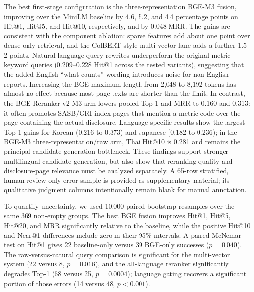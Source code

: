 \documentclass[sigconf,article]{acmart}
\begin{document}
The best first-stage configuration is the three-representation BGE-M3 fusion, improving over the MiniLM baseline by 4.6, 5.2, and 4.4 percentage points on Hit@1, Hit@5, and Hit@10, respectively, and by 0.048 MRR. The gains are consistent with the component ablation: sparse features add about one point over dense-only retrieval, and the ColBERT-style multi-vector lane adds a further 1.5--2 points. Natural-language query rewrites underperform the original metric-keyword queries (0.209--0.228 Hit@1 across the tested variants), suggesting that the added English ``what counts'' wording introduces noise for non-English reports. Increasing the BGE maximum length from 2,048 to 8,192 tokens has almost no effect because most page texts are shorter than the limit. In contrast, the BGE-Reranker-v2-M3 arm lowers pooled Top-1 and MRR to 0.160 and 0.313: it often promotes SASB/GRI index pages that mention a metric code over the page containing the actual disclosure. Language-specific results show the largest Top-1 gains for Korean (0.216 to 0.373) and Japanese (0.182 to 0.236); in the BGE-M3 three-representation/raw arm, Thai Hit@10 is 0.281 and remains the principal candidate-generation bottleneck. These findings support stronger multilingual candidate generation, but also show that reranking quality and disclosure-page relevance must be analyzed separately. A 65-row stratified, human-review-only error sample is provided as supplementary material; its qualitative judgment columns intentionally remain blank for manual annotation.

To quantify uncertainty, we used 10,000 paired bootstrap resamples over the same 369 non-empty groups. The best BGE fusion improves Hit@1, Hit@5, Hit@20, and MRR significantly relative to the baseline, while the positive Hit@10 and Near@1 differences include zero in their 95\% intervals. A paired McNemar test on Hit@1 gives 22 baseline-only versus 39 BGE-only successes ($p=0.040$). The raw-versus-natural query comparison is significant for the multi-vector system (22 versus 8, $p=0.016$), and the all-language reranker significantly degrades Top-1 (58 versus 25, $p=0.0004$); language gating recovers a significant portion of those errors (14 versus 48, $p<0.001$).
\end{document}
